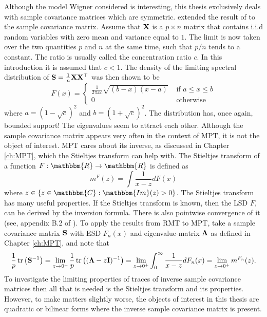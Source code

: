 \documentclass[12pt, oneside]{book}\usepackage{knitr}
\begin{document}
Although the model Wigner considered is interesting, this thesis exclusively deals with sample covariance matrices which are symmetric.
\citet{marchenko1967distribution} extended the result of \citet{wigner1967random} to the sample covariance matrix.
Assume that $\mathbf{X}$ is a $p \times n$ matrix that contains i.i.d random variables with zero mean and variance equal to $1$.
The limit is now taken over the two quantities $p$ and $n$ at the same time, such that $p/n$ tends to a constant.
The ratio is usually called the concentration ratio $c$.
In this introduction it is assumed that $c<1$.
The density of the limiting spectral distribution of $\mathbf{S}=\frac{1}{n} \mathbf{X} \mathbf{X}^\top$ was then shown to be
$$
F(x) = \begin{cases}
\frac{1}{2\pi x c} \sqrt{(b-x)(x-a)} & \text{ if } a \leq x \leq b\\
0 & \text{ otherwise}
\end{cases}
$$
where $a=(1-\sqrt{c})^2$ and $b=(1+\sqrt{c})^2$. 
The distribution has, once again, bounded support! 
The eigenvalues seem to attract each other. 
Although the sample covariance matrix appears very often in the context of MPT, it is not the object of interest. 
MPT cares about its inverse, as discussed in Chapter \ref{ch:MPT}, which the Stieltjes transform can help with. 
The Stieltjes transform of a function $F: \mathbbm{R} \rightarrow \mathbbm{R}$ is defined as 
\begin{equation}\label{eqn:stieltjes}
m^F(z) = \int \frac{1}{x-z}dF(x)
\end{equation}
where $z \in \{z \in \mathbbm{C}: \mathbbm{Im}(z)>0 \}$. 
The Stieltjes transform has many useful properties. 
If the Stieltjes transform is known, then the LSD $F$, can be derived by the inversion formula. 
There is also pointwise convergence of it (see, appendix B.2 of \citet{bai2010spectral}). 
To apply the results from RMT to MPT, take a sample covariance matrix $\mathbf{S}$ with ESD $F_n(x)$ and eigenvalue-matrix $\boldsymbol{\Lambda}$ as defined in Chapter \ref{ch:MPT}, and note that
\begin{equation}
\frac{1}{p}\operatorname{tr} \left( \mathbf{S}^{-1} \right) = \lim_{z\rightarrow 0^+} \frac{1}{p} \operatorname{tr} \left( (\boldsymbol{\Lambda} -z\mathbf{I})^{-1} \right) = \lim_{z\rightarrow 0^+} \int_0^\infty \frac{1}{x - z} dF_n(x) = \lim_{z\rightarrow 0^+} m^{F_n}(z).
\end{equation}
To investigate the limiting properties of traces of inverse sample covariance matrices then all that is needed is the Stieltjes transform and its properties. 
However, to make matters slightly worse, the objects of interest in this thesis are quadratic or bilinear forms where the inverse sample covariance matrix is present. 
\end{document}
